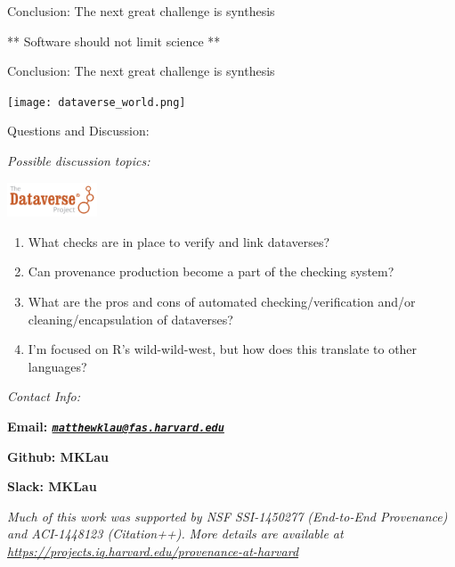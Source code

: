 \documentclass[ignorenonframetext,]{beamer}
\providecommand{\tightlist}{%
  \setlength{\itemsep}{0pt}\setlength{\parskip}{0pt}}
\begin{document}
\begin{frame}{Conclusion: The next great challenge is synthesis}
\protect\hypertarget{conclusion-the-next-great-challenge-is-synthesis}{}

** Software should not limit science **

\end{frame}

\begin{frame}{Conclusion: The next great challenge is synthesis}
\protect\hypertarget{conclusion-the-next-great-challenge-is-synthesis-1}{}

\texttt{[image: dataverse\_world.png]}

\end{frame}

\begin{frame}{Questions and Discussion:}
\protect\hypertarget{questions-and-discussion}{}

\emph{Possible discussion topics:}

\includegraphics[width=0.2\textwidth,height=\textheight]{dataverse_r_project.png}

\begin{enumerate}
\tightlist
\item
  What checks are in place to verify and link dataverses?
\item
  Can provenance production become a part of the checking system?
\item
  What are the pros and cons of automated checking/verification and/or
  cleaning/encapsulation of dataverses?
\item
  I'm focused on R's wild-wild-west, but how does this translate to
  other languages?
\end{enumerate}

\emph{Contact Info:}

\textbf{Email:
\emph{\href{mailto:matthewklau@fas.harvard.edu}{\nolinkurl{matthewklau@fas.harvard.edu}}}}

\textbf{Github: MKLau}

\textbf{Slack: MKLau}

\emph{Much of this work was supported by NSF SSI-1450277 (End-to-End
Provenance) and ACI-1448123 (Citation++).} \emph{More details are
available at
\url{https://projects.iq.harvard.edu/provenance-at-harvard}}


\end{frame}
\end{document}

